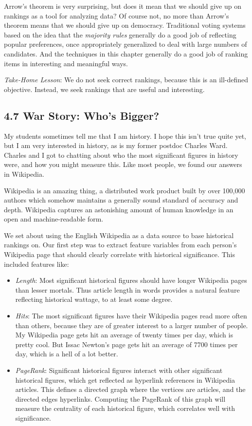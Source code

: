\documentclass[10pt]{article}
\begin{document}
Arrow’s theorem is very surprising, but does it mean that we should give up on rankings as a tool for analyzing data? Of course not, no more than Arrow’s theorem means that we should give up on democracy. Traditional voting systems based on the idea that the \textit{majority rules} generally do a good job of reflecting popular preferences, once appropriately generalized to deal with large numbers of candidates. And the techniques in this chapter generally do a good job of ranking items in interesting and meaningful ways.

\textit{Take-Home Lesson}: We do not seek correct rankings, because this is an ill-defined objective. Instead, we seek rankings that are useful and interesting.

\subsection*{4.7 War Story: Who’s Bigger?}
My students sometimes tell me that I am history. I hope this isn’t true quite yet, but I am very interested in history, as is my former postdoc Charles Ward. Charles and I got to chatting about who the most significant figures in history were, and how you might measure this. Like most people, we found our answers in Wikipedia.

Wikipedia is an amazing thing, a distributed work product built by over 100,000 authors which somehow maintains a generally sound standard of accuracy and depth. Wikipedia captures an astonishing amount of human knowledge in an open and machine-readable form.

We set about using the English Wikipedia as a data source to base historical rankings on. Our first step was to extract feature variables from each person’s Wikipedia page that should clearly correlate with historical significance. This included features like:

\begin{itemize}
    \item \textit{Length}: Most significant historical figures should have longer Wikipedia pages than lesser mortals. Thus article length in words provides a natural feature reflecting historical wattage, to at least some degree.
    \item \textit{Hits}: The most significant figures have their Wikipedia pages read more often than others, because they are of greater interest to a larger number of people. My Wikipedia page gets hit an average of twenty times per day, which is pretty cool. But Issac Newton’s page gets hit an average of 7700 times per day, which is a hell of a lot better.
    \item \textit{PageRank}: Significant historical figures interact with other significant historical figures, which get reflected as hyperlink references in Wikipedia articles. This defines a directed graph where the vertices are articles, and the directed edges hyperlinks. Computing the PageRank of this graph will measure the centrality of each historical figure, which correlates well with significance.
\end{itemize}
\end{document}
